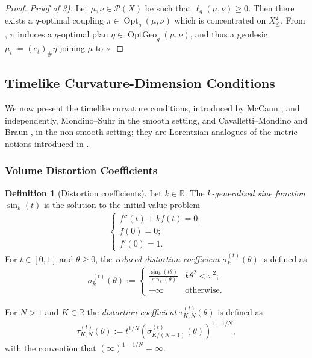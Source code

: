 \documentclass{article}
\newcommand{\R}{\mathbb{R}}
\newcommand{\Pcal}{\mathcal{P}}
\DeclareMathOperator{\Opt}{Opt}
\DeclareMathOperator{\OptGeo}{OptGeo}
\theoremstyle{definition}
\newtheorem{defn}{Definition}[section]
\begin{document}
{\begin{proof}
{\it Proof of 3).} Let $\mu,\nu\in \Pcal(X)$ be such that $\ell_q(\mu,\nu)\geq0$. Then there exists a $q$-optimal coupling $\pi\in \Opt_q(\mu,\nu)$ which is concentrated on $X_\leq^2$. From , $\pi$ induces a $q$-optimal plan $\eta\in \OptGeo_q(\mu,\nu)$, and thus a geodesic $\mu_t:= (e_t)_\#\eta$ joining $\mu$ to $\nu$.  

\end{proof}
\subsection{Timelike Curvature-Dimension Conditions} 

We now present the timelike curvature conditions, introduced by McCann \cite{McCann}, and independently, Mondino--Suhr \cite{MS} in the smooth setting, and Cavalletti--Mondino \cite{CM} and Braun \cite{Braun}, in the non-smooth setting; they are Lorentzian analogues of the metric notions introduced in \cite{LV, SturmI, SturmII, EKS}. 

\subsubsection{Volume Distortion Coefficients}
\begin{defn}[Distortion coefficients] Let $k\in\R$. The {\it $k$-generalized sine function} $\sin_k(t)$ is the solution to the initial value problem 
\begin{align}
\begin{cases}
f''(t)+kf(t)=0;\\
f(0)=0;\\
f'(0)=1.
\end{cases}
\end{align}
For $t\in [0,1]$ and $\theta\geq 0$, the {\it reduced distortion coefficient} $\sigma_{k}^{(t)}(\theta)$ is defined as 
\begin{align}
\sigma_k^{(t)}(\theta):=\begin{cases}
\displaystyle \frac{\sin_k(t\theta)}{\sin_k(\theta)} & k\theta^2<\pi^2;\\
+\infty &\text{otherwise.}
\end{cases}
\end{align}

For $N>1$ and $K\in \R$ the {\it distortion coefficient} $\tau_{K,N}^{(t)}(\theta)$ is defined as 
\begin{align}
\tau_{K,N}^{(t)}(\theta):= t^{1/N}\left(\sigma_{K/(N-1)}^{(t)}(\theta)\right)^{1-1/N},
\end{align}
with the convention that $(\infty)^{1-1/N}=\infty$. 
\end{defn}



}
\end{document}
